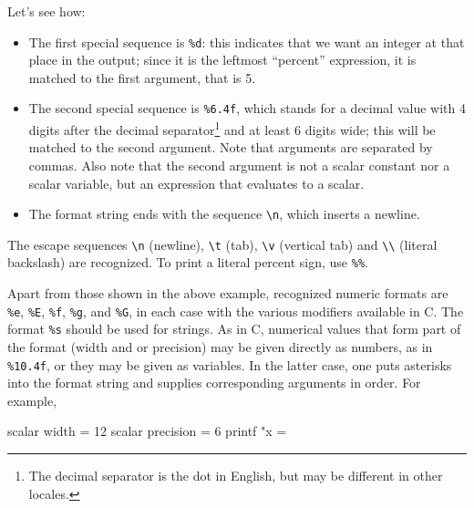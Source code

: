 Let's see how:
\begin{itemize}
\item The first special sequence is \verb|%d|: this indicates that we
  want an integer at that place in the output; since it is the
  leftmost ``percent'' expression, it is matched to the first
  argument, that is 5.
\item The second special sequence is \verb|%6.4f|, which stands for a
  decimal value with 4 digits after the decimal separator\footnote{The
    decimal separator is the dot in English, but may be different in
    other locales.} and at least 6 digits wide; this will be matched
  to the second argument. Note that arguments are separated by
  commas. Also note that the second argument is not a scalar constant
  nor a scalar variable, but an expression that evaluates to a scalar.
\item The format string ends with the sequence \verb|\n|, which
  inserts a newline.
\end{itemize}

The escape sequences \verb|\n| (newline), \verb|\t| (tab), \verb|\v|
(vertical tab) and \verb|\\| (literal backslash) are recognized. To
print a literal percent sign, use \verb|%%|.

Apart from those shown in the above example, recognized numeric
formats are \verb|%e|, \verb|%E|, \verb|%f|, \verb|%g|, and \verb|%G|,
in each case with the various modifiers available in C. The format
\verb|%s| should be used for strings. As in C, numerical values that
form part of the format (width and or precision) may be given directly
as numbers, as in \verb|%10.4f|, or they may be given as variables. In
the latter case, one puts asterisks into the format string and
supplies corresponding arguments in order. For example,

\begin{code}
  scalar width = 12 
  scalar precision = 6 
  printf "x = %
\end{code}

